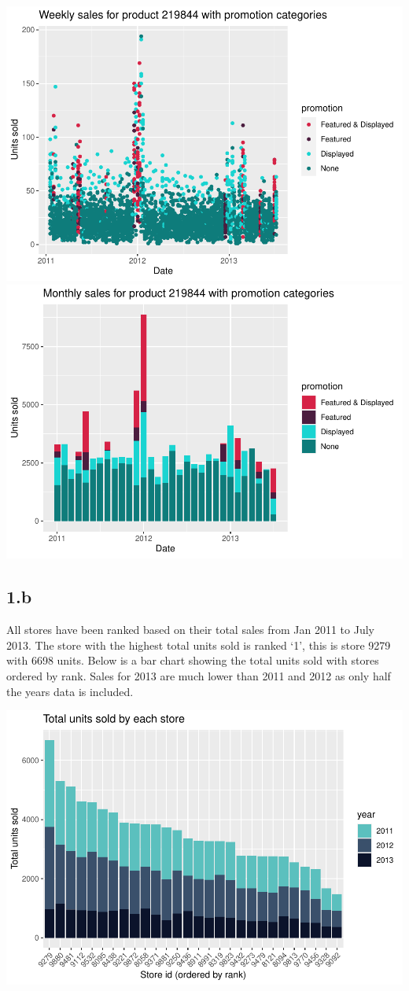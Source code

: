 \documentclass[
  11pt,
]{article}
\begin{document}
\includegraphics[width=0.5\linewidth]{Assignment-STAT702---final_files/figure-latex/test, figures-side-1}
\includegraphics[width=0.5\linewidth]{Assignment-STAT702---final_files/figure-latex/test, figures-side-2}

\hypertarget{b}{%
\subsection{1.b}\label{b}}

All stores have been ranked based on their total sales from Jan 2011 to
July 2013. The store with the highest total units sold is ranked `1',
this is store 9279 with 6698 units. Below is a bar chart showing the
total units sold with stores ordered by rank. Sales for 2013 are much
lower than 2011 and 2012 as only half the years data is included.

\includegraphics[width=0.75\linewidth]{Assignment-STAT702---final_files/figure-latex/1b store totals plotted-1}
\end{document}
